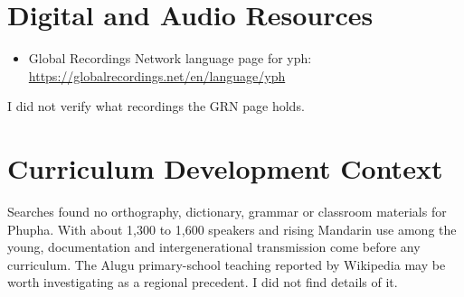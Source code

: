 \documentclass[12pt]{article}
\begin{document}
\section{Digital and Audio Resources}
\begin{itemize}
\item Global Recordings Network language page for yph: \url{https://globalrecordings.net/en/language/yph}
\end{itemize}
I did not verify what recordings the GRN page holds.

\section{Curriculum Development Context}
Searches found no orthography, dictionary, grammar or classroom materials for Phupha. With about 1,300 to 1,600 speakers and rising Mandarin use among the young, documentation and intergenerational transmission come before any curriculum. The Alugu primary-school teaching reported by Wikipedia may be worth investigating as a regional precedent. I did not find details of it.
\end{document}
